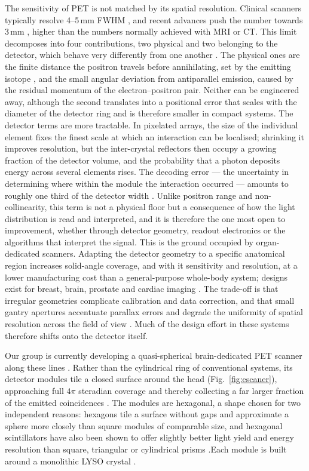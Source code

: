 \documentclass[10pt,conference]{IEEEtran}
\begin{document}
The sensitivity of PET is not matched by its spatial resolution. Clinical
scanners typically resolve 4--5\,mm FWHM \cite{spencer2021}, and
recent advances push the number towards 3\,mm \cite{spencer2021,
gonzalezmontoro2022brain} , higher than the numbers normally achieved with MRI or CT. This limit decomposes into four
contributions, two physical and two belonging to the detector, which behave
very differently from one another \cite{moses2011}. The physical ones are
the finite distance the positron travels before annihilating, set by the
emitting isotope \cite{levin1999}, and the small angular deviation from
antiparallel emission, caused by the residual momentum of the
electron--positron pair. Neither can be engineered away, although the second
translates into a positional error that scales with the diameter of the
detector ring and is therefore smaller in compact systems. The detector terms are more tractable. In pixelated arrays, the size of the
individual element fixes the finest scale at which an interaction can be
localised; shrinking it improves resolution, but the inter-crystal
reflectors then occupy a growing fraction of the detector volume, and the
probability that a photon deposits energy across several elements rises.
The decoding error --- the uncertainty in determining where within the
module the interaction occurred --- amounts to roughly one third of the
detector width \cite{moses2011}. Unlike positron range and non-collinearity,
this term is not a physical floor but a consequence of how the light
distribution is read and interpreted, and it is therefore the one most open to improvement, whether through detector geometry, readout electronics or the algorithms that interpret
the signal.
This is the ground occupied by organ-dedicated scanners. Adapting the
detector geometry to a specific anatomical region increases solid-angle
coverage, and with it sensitivity and resolution, at a lower manufacturing
cost than a general-purpose whole-body system; designs exist for breast,
brain, prostate and cardiac imaging \cite{sanaat2024}. The trade-off is that
irregular geometries complicate calibration and data correction, and that
small gantry apertures accentuate parallax errors and degrade the uniformity
of spatial resolution across the field of view \cite{sanaat2024}. Much of
the design effort in these systems therefore shifts onto the detector
itself.

Our group is currently developing a quasi-spherical brain-dedicated PET
scanner along these lines \cite{perez-benito_sipm-based_2019}. Rather than
the cylindrical ring of conventional systems, its detector modules tile a
closed surface around the head (Fig.~\ref{fig:escaner}), approaching full $4\pi$ steradian coverage
and thereby collecting a far larger fraction of the emitted coincidences
\cite{perez-benito_sipm-based_2019}. The modules are hexagonal, a shape
chosen for two independent reasons: hexagons tile a surface without gaps and
approximate a sphere more closely than square modules of comparable size,
and hexagonal scintillators have also been shown to offer slightly better
light yield and energy resolution than square, triangular or cylindrical
prisms \cite{perez-benito_scintillator_2023}.Each module is built around a monolithic LYSO crystal
\cite{perez-benito_laser-microstructured_2025}.
\end{document}
